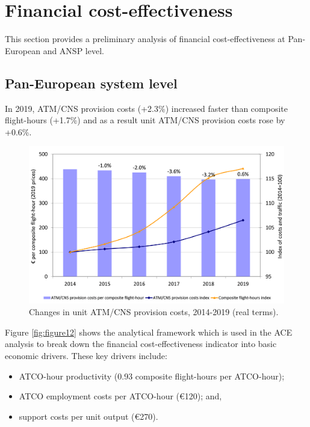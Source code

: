 \documentclass[
]{book}
\providecommand{\tightlist}{%
  \setlength{\itemsep}{0pt}\setlength{\parskip}{0pt}}
\begin{document}
\hypertarget{financial}{%
\chapter{Financial cost-effectiveness}\label{financial}}

This section provides a preliminary analysis of financial cost-effectiveness at Pan-European and ANSP level.

\hypertarget{pan-european-system-level}{%
\section{Pan-European system level}\label{pan-european-system-level}}

In 2019, ATM/CNS provision costs (+2.3\%) increased faster than composite flight-hours (+1.7\%) and as a result unit ATM/CNS provision costs rose by +0.6\%.



\begin{figure}

{\centering \includegraphics[width=1\linewidth]{figures/Figure 4-1} 

}

\caption{Changes in unit ATM/CNS provision costs, 2014-2019 (real terms).}\label{fig:figure11}
\end{figure}

Figure \ref{fig:figure12} shows the analytical framework which is used in the ACE analysis to break down the financial cost-effectiveness indicator into basic economic drivers. These key drivers include:

\begin{itemize}
\tightlist
\item
  ATCO-hour productivity (0.93 composite flight-hours per ATCO-hour);
\item
  ATCO employment costs per ATCO-hour (€120); and,
\item
  support costs per unit output (€270).
\end{itemize}
\end{document}
